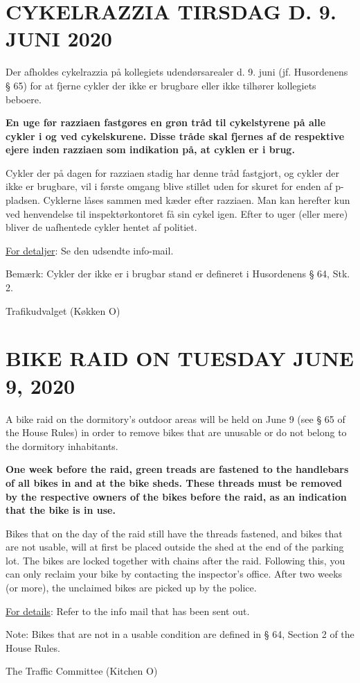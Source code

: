 \documentclass[12pt,a4paper]{article}
\begin{document}
\section*{CYKELRAZZIA TIRSDAG D. 9. JUNI 2020}
Der afholdes cykelrazzia på kollegiets udendørsarealer d. 9. juni (jf. Husordenens § 65) for at fjerne cykler der ikke er brugbare eller ikke tilhører kollegiets beboere.

\textbf{En uge før razziaen fastgøres en grøn tråd til cykelstyrene på alle cykler i og ved cykelskurene. Disse tråde skal fjernes af de respektive ejere inden razziaen som indikation på, at cyklen er i brug.}

Cykler der på dagen for razziaen stadig har denne tråd fastgjort, og cykler der ikke er brugbare, vil i første omgang blive stillet uden for skuret for enden af p-pladsen. Cyklerne låses sammen med kæder efter razziaen. Man kan herefter kun ved henvendelse til inspektørkontoret få sin cykel igen. Efter to uger (eller mere) bliver de uafhentede cykler hentet af politiet.

\underline{For detaljer}: Se den udsendte info-mail.

Bemærk: Cykler der ikke er i brugbar stand er defineret i Husordenens § 64, Stk. 2.

\hspace*{2cm} Trafikudvalget (Køkken O)

\section*{BIKE RAID ON TUESDAY JUNE 9, 2020}
A bike raid on the dormitory's outdoor areas will be held on June 9 (see § 65 of the House Rules) in order to remove bikes that are unusable or do not belong to the dormitory inhabitants.

\textbf{One week before the raid, green treads are fastened to the handlebars of all bikes in and at the bike sheds. These threads must be removed by the respective owners of the bikes before the raid, as an indication that the bike is in use.}

Bikes that on the day of the raid still have the threads fastened, and bikes that are not usable, will at first be placed outside the shed at the end of the parking lot. The bikes are locked together with chains after the raid. Following this, you can only reclaim your bike by contacting the inspector’s office. After two weeks (or more), the unclaimed bikes are picked up by the police.

\underline{For details}: Refer to the info mail that has been sent out.

Note: Bikes that are not in a usable condition are defined in § 64, Section 2 of the House Rules.

\hspace*{2cm} The Traffic Committee (Kitchen O)
\end{document}
